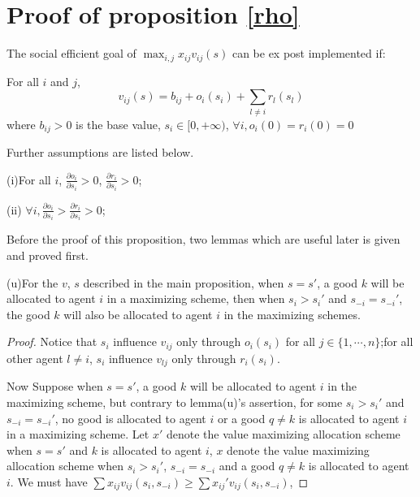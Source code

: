 
\chapter{Proof of proposition \ref{rho}} %

\label{Appendix_C} %
\begin{prop*}
  The social efficient goal of $\max_{i,j}x_{ij}v_{ij}(s)$ can be ex post implemented if:
  
For all $i$ and $j$,
$$v_{ij}(s)=b_{ij} + o_i(s_i) + \sum_{l \not = i} r_l(s_l) $$
where $b_{ij}>0$ is the base value, $s_i \in [0, + \infty)$, $\forall i,o_i(0)=r_i(0)=0$

Further assumptions are listed below.

(i)For all $i$, $\frac{\partial o_i}{\partial s_i} > 0$, $\frac{\partial r_i}{\partial s_i} > 0$;

(ii) $\forall i, \frac{\partial o_i}{\partial s_i}
> \frac{\partial r_i}{\partial s_i} > 0$;

\end{prop*}

Before the proof of this proposition,  two lemmas which are useful later is given and proved first.
\begin{lemma*}
  (u)For the $v$, $s$ described in the main proposition, when $s= s'$, a good $k$ will be allocated to agent $i$ in a maximizing scheme, then when $s_i > s_i'$ and $s_{-i}=s_{-i}'$, the good $k$ will also be allocated to agent $i$ in the maximizing schemes. 
\end{lemma*}
\begin{proof}
  Notice that $s_i$ influence $v_{ij}$ only through $o_i(s_i)$ for all $j \in \{1,\cdots,n\}$;for all other agent $l \not = i$, $s_i$ influence $v_{lj}$ only through $r_i(s_i)$.

  Now Suppose when $s= s'$, a good $k$ will be allocated to agent $i$ in the maximizing scheme, but contrary to lemma(u)'s assertion, for some $s_i > s_i'$ and $s_{-i}=s_{-i}'$,  no good is allocated to agent $i$ or a good $q \not= k$ is allocated to agent $i$ in a maximizing scheme. Let $x'$ denote the value maximizing allocation scheme when $s=s'$ and $k$ is allocated to agent $i$, $x$ denote the value maximizing allocation scheme when $s_i>s_i'$, $s_{-i}=s_{-i}$ and a good $q \not= k$ is allocated to agent $i$. We must have $\sum x_{ij}v_{ij}(s_i,s_{-i}) \geq \sum x_{ij}'v_{ij}(s_i,s_{-i})$,  
\end{proof}

